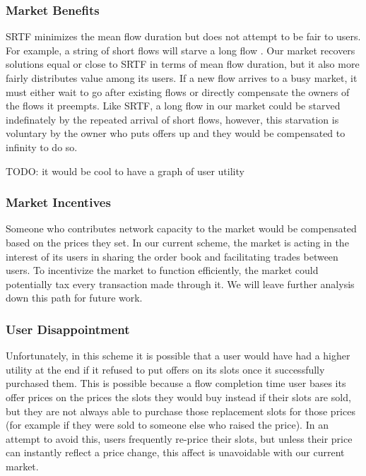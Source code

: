 \subsubsection{Market Benefits}
SRTF minimizes the mean flow duration but does not attempt to be fair to users. For example, a string of short flows will starve a long flow \cite{bender98}.
Our market recovers solutions equal or close to SRTF in terms of mean flow duration, but it also more fairly distributes value among its users.
If a new flow arrives to a busy market, it must either wait to go after existing flows or directly compensate the owners of the flows it preempts. Like SRTF, a long flow in our market could be starved indefinately by the repeated arrival of short flows, however, this starvation is voluntary by the owner who puts offers up and they would be compensated to infinity to do so.

TODO: it would be cool to have a graph of user utility
\subsubsection{Market Incentives}
Someone who contributes network capacity to the market would be compensated based on the prices they set.
In our current scheme, the market is acting in the interest of its users in sharing the order book and facilitating trades between users.
To incentivize the market to function efficiently, the market could potentially tax every transaction made through it. We will leave further analysis down this path for future work.

\subsubsection{User Disappointment}
Unfortunately, in this scheme it is possible that a user would have had a higher utility at the end if it refused to put offers on its slots once it successfully purchased them.
This is possible because a flow completion time user bases its offer prices on the prices the slots they would buy instead if their slots are sold, but they are not always able to purchase those replacement slots for those prices (for example if they were sold to someone else who raised the price). In an attempt to avoid this, users frequently re-price their slots, but unless their price can instantly reflect a price change, this affect is unavoidable with our current market.

